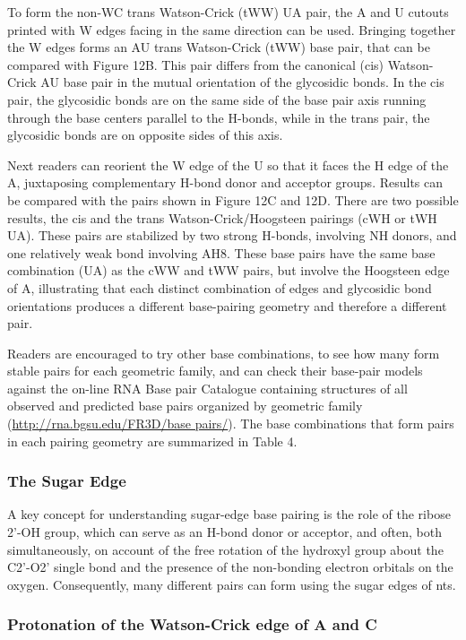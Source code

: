To form the non-WC trans Watson-Crick (tWW) UA pair, the A and U cutouts printed
with W edges facing in the same direction can be used.  Bringing together the W
edges forms an AU trans Watson-Crick (tWW) base pair, that can be compared with
Figure 12B. This pair differs from the canonical (cis) Watson-Crick AU base pair
in the mutual orientation of the glycosidic bonds. In the cis pair, the
glycosidic bonds are on the same side of the base pair axis running through the
base centers parallel to the H-bonds, while in the trans pair, the glycosidic
bonds are on opposite sides of this axis.  

Next readers can reorient the W edge of the U so that it faces the H edge of the
A, juxtaposing complementary H-bond donor and acceptor groups. Results can be
compared with the pairs shown in Figure 12C and 12D. There are two possible
results, the cis and the trans Watson-Crick/Hoogsteen pairings (cWH or tWH UA).
These pairs are stabilized by two strong H-bonds, involving NH donors, and one
relatively weak bond involving AH8. These base pairs have the same base
combination (UA) as the cWW and tWW pairs, but involve the Hoogsteen edge of A,
illustrating that each distinct combination of edges and glycosidic bond
orientations produces a different base-pairing geometry and therefore a
different pair. 

Readers are encouraged to try other base combinations, to see how many form
stable pairs for each geometric family, and can check their base-pair models
against the on-line RNA Base pair Catalogue containing structures of all
observed and predicted base pairs organized by geometric family
(\url{http://rna.bgsu.edu/FR3D/base pairs/}). The base combinations that form
pairs in each pairing geometry are summarized in Table 4.

\subsubsection{The Sugar Edge}

A key concept for understanding sugar-edge base pairing is the role of the
ribose 2’-OH group, which can serve as an H-bond donor or acceptor, and often,
both simultaneously, on account of the free rotation of the hydroxyl group about
the C2’-O2’ single bond and the presence of the non-bonding electron orbitals on
the oxygen. Consequently, many different pairs can form using the sugar edges of
nts.  

\subsubsection{Protonation of the Watson-Crick edge of A and C}

